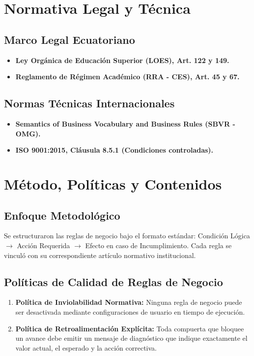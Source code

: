 \documentclass[12pt,a4paper]{article}
\begin{document}
\section{Normativa Legal y Técnica}
\subsection{Marco Legal Ecuatoriano}
\begin{itemize}[leftmargin=1.5em, itemsep=2pt]
    \item \textbf{Ley Orgánica de Educación Superior (LOES), Art. 122 y 149.}
    \item \textbf{Reglamento de Régimen Académico (RRA - CES), Art. 45 y 67.}
\end{itemize}
\subsection{Normas Técnicas Internacionales}
\begin{itemize}[leftmargin=1.5em, itemsep=2pt]
    \item \textbf{Semantics of Business Vocabulary and Business Rules (SBVR - OMG).}
    \item \textbf{ISO 9001:2015, Cláusula 8.5.1 (Condiciones controladas).}
\end{itemize}

\section{Método, Políticas y Contenidos}
\subsection{Enfoque Metodológico}
Se estructuraron las reglas de negocio bajo el formato estándar: Condición Lógica $\to$ Acción Requerida $\to$ Efecto en caso de Incumplimiento. Cada regla se vinculó con su correspondiente artículo normativo institucional.

\subsection{Políticas de Calidad de Reglas de Negocio}
\begin{enumerate}[leftmargin=1.5em, itemsep=2pt]
    \item \textbf{Política de Inviolabilidad Normativa:} Ninguna regla de negocio puede ser desactivada mediante configuraciones de usuario en tiempo de ejecución.
    \item \textbf{Política de Retroalimentación Explícita:} Toda compuerta que bloquee un avance debe emitir un mensaje de diagnóstico que indique exactamente el valor actual, el esperado y la acción correctiva.
\end{enumerate}
\end{document}
